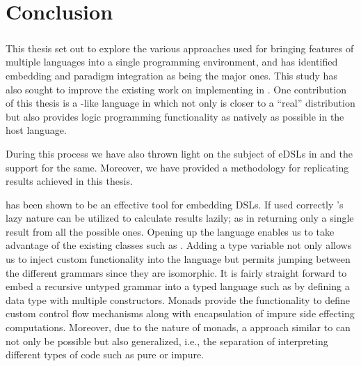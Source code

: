 \documentclass[thesis-solanki.tex]{subfiles}
\begin{document}
\chapter{Conclusion}\label{chap:conclusion}
\paragraph{}
This thesis set out to explore the various approaches used for bringing features of multiple languages into a single 
programming environment, and has identified embedding and paradigm integration as being the major ones. This study has also sought to improve
the existing work on implementing  in . One contribution of this thesis is a  
-like language in  which not only is closer to a ``real''  distribution but also provides 
logic programming functionality as natively as possible in the host language.

During this process we have also thrown light on the subject of eDSLs in  and the support for the same. Moreover, we
have provided a methodology for replicating results achieved in this thesis.

 has been shown to be an effective tool for embedding DSLs. If used correctly 's lazy nature can be utilized to calculate results lazily; as in returning only a single result from all
the possible ones. Opening up the language enables us to take advantage of the existing classes such as . Adding a type variable not only allows us to 
inject custom functionality into the language but permits jumping between the different grammars since they are isomorphic. It is fairly straight forward to embed a recursive untyped grammar into a typed language 
such as  by defining a data type with multiple constructors. Monads provide the functionality to define custom control flow mechanisms along with encapsulation of impure side effecting 
computations. Moreover, due to the nature of monads, a approach similar to  can not only be possible but also generalized, i.e., the separation of interpreting different types
of code such as pure or impure.
\end{document}
